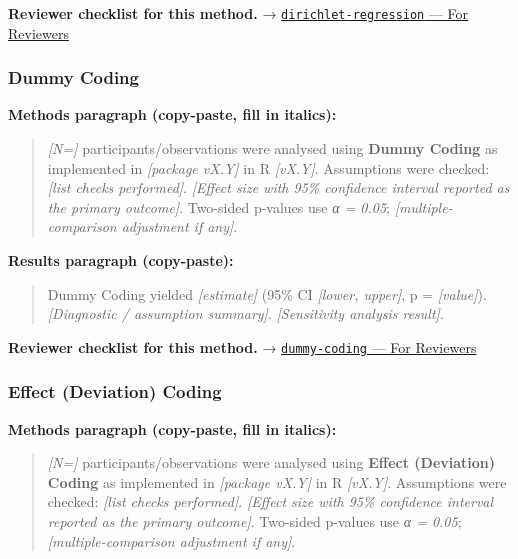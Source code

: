 \documentclass[
]{article}
\begin{document}
\textbf{Reviewer checklist for this method.} →
\href{../chapters/07-regression/dirichlet-regression.Rmd\#for-reviewers}{\texttt{dirichlet-regression}
--- For Reviewers}

\subsubsection{Dummy Coding}\label{dummy-coding}

\textbf{Methods paragraph (copy-paste, fill in italics):}

\begin{quote}
\emph{{[}N={]}} participants/observations were analysed using
\textbf{Dummy Coding} as implemented in \emph{{[}package vX.Y{]}} in R
\emph{{[}vX.Y{]}}. Assumptions were checked: \emph{{[}list checks
performed{]}}. \emph{{[}Effect size with 95\% confidence interval
reported as the primary outcome{]}}. Two-sided p-values use \emph{α =
0.05}; \emph{{[}multiple-comparison adjustment if any{]}}.
\end{quote}

\textbf{Results paragraph (copy-paste):}

\begin{quote}
Dummy Coding yielded \emph{{[}estimate{]}} (95\% CI \emph{{[}lower,
upper{]}}, p = \emph{{[}value{]}}). \emph{{[}Diagnostic / assumption
summary{]}}. \emph{{[}Sensitivity analysis result{]}}.
\end{quote}

\textbf{Reviewer checklist for this method.} →
\href{../chapters/07-regression/dummy-coding.Rmd\#for-reviewers}{\texttt{dummy-coding}
--- For Reviewers}

\subsubsection{Effect (Deviation) Coding}\label{effect-deviation-coding}

\textbf{Methods paragraph (copy-paste, fill in italics):}

\begin{quote}
\emph{{[}N={]}} participants/observations were analysed using
\textbf{Effect (Deviation) Coding} as implemented in \emph{{[}package
vX.Y{]}} in R \emph{{[}vX.Y{]}}. Assumptions were checked: \emph{{[}list
checks performed{]}}. \emph{{[}Effect size with 95\% confidence interval
reported as the primary outcome{]}}. Two-sided p-values use \emph{α =
0.05}; \emph{{[}multiple-comparison adjustment if any{]}}.
\end{quote}
\end{document}
